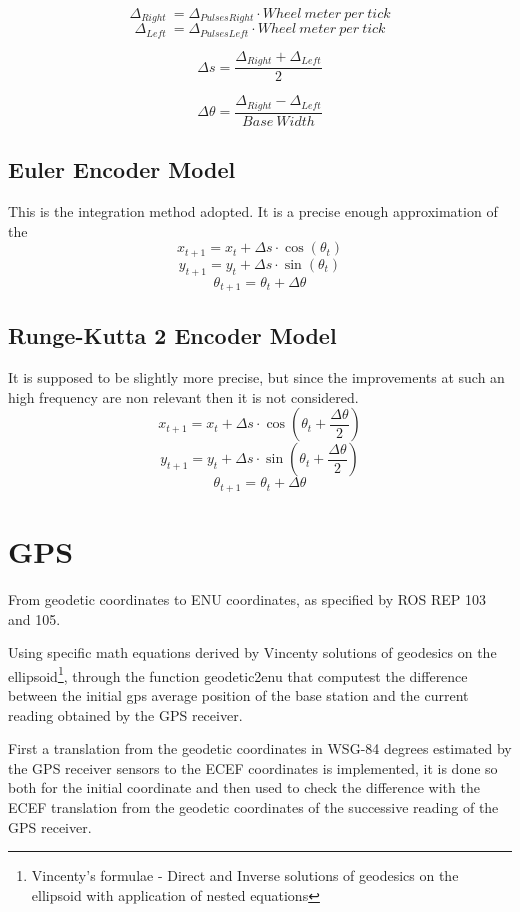 {$$
\Delta _{Right} ~ = \Delta _{PulsesRight} \cdot Wheel~meter~per~tick
$$
$$
\Delta _{Left} ~ = \Delta _{PulsesLeft} \cdot Wheel~meter~per~tick
$$

$$
\Delta s = \frac{\Delta _{Right} + \Delta _{Left}}{2}
$$


$$
\Delta {\theta} = \frac{\Delta _{Right} - \Delta _{Left}}{Base~Width}
$$

\subsection{Euler Encoder Model}

\noindent This is the integration method adopted. It is a precise enough approximation of the
$$
x_{t+1} = x_t + \Delta s \cdot \cos(\theta_t)
$$
$$
y_{t+1} = y_t + \Delta s \cdot \sin(\theta_t)
$$
$$
\theta_{t+1} = \theta_t + \Delta {\theta}
$$

\subsection{Runge-Kutta 2 Encoder Model}

\noindent It is supposed to be slightly more precise, but since the improvements at such an high frequency are non relevant then it is not considered.
$$
x_{t+1} = x_t + \Delta s \cdot \cos(\theta_t + \frac{\Delta{\theta}}{2} )
$$
$$
y_{t+1} = y_t + \Delta s \cdot \sin(\theta_t + \frac{\Delta{\theta}}{2} )
$$
$$
\theta_{t+1} = \theta_t + \Delta {\theta}
$$





\section{GPS}
\noindent
From geodetic coordinates to ENU coordinates, as specified by ROS REP 103 and 105.

Using  specific math equations derived by Vincenty solutions of geodesics on the ellipsoid\footnote{Vincenty's formulae  -  Direct and Inverse solutions of geodesics on the ellipsoid with application of nested equations}, through the function geodetic2enu that computest the difference between the initial gps average position of the base station and the current reading obtained by the GPS receiver.

First a translation from the geodetic coordinates in WSG-84 degrees estimated by the GPS receiver sensors to the ECEF coordinates is implemented, it is done so both for the initial coordinate and then used to check the difference with the ECEF translation from the geodetic coordinates of the successive reading of the GPS receiver.


}
